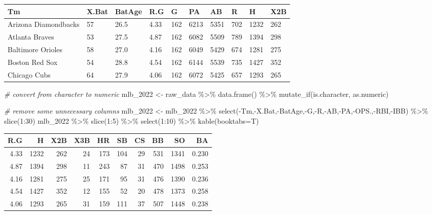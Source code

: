 \documentclass[
  11pt,
]{book}
\newenvironment{Shaded}{\begin{snugshade}}{\end{snugshade}}
\newcommand{\AttributeTok}[1]{\textcolor[rgb]{0.77,0.63,0.00}{#1}}
\newcommand{\CommentTok}[1]{\textcolor[rgb]{0.56,0.35,0.01}{\textit{#1}}}
\newcommand{\DecValTok}[1]{\textcolor[rgb]{0.00,0.00,0.81}{#1}}
\newcommand{\FunctionTok}[1]{\textcolor[rgb]{0.00,0.00,0.00}{#1}}
\newcommand{\NormalTok}[1]{#1}
\newcommand{\OtherTok}[1]{\textcolor[rgb]{0.56,0.35,0.01}{#1}}
\newcommand{\SpecialCharTok}[1]{\textcolor[rgb]{0.00,0.00,0.00}{#1}}
\theoremstyle{definition}
\theoremstyle{definition}
\theoremstyle{definition}
\theoremstyle{definition}
\theoremstyle{remark}
\begin{document}
\begin{tabular}{llllllllll}
\toprule
Tm & X.Bat & BatAge & R.G & G & PA & AB & R & H & X2B\\
\midrule
Arizona Diamondbacks & 57 & 26.5 & 4.33 & 162 & 6213 & 5351 & 702 & 1232 & 262\\
Atlanta Braves & 53 & 27.5 & 4.87 & 162 & 6082 & 5509 & 789 & 1394 & 298\\
Baltimore Orioles & 58 & 27.0 & 4.16 & 162 & 6049 & 5429 & 674 & 1281 & 275\\
Boston Red Sox & 54 & 28.8 & 4.54 & 162 & 6144 & 5539 & 735 & 1427 & 352\\
Chicago Cubs & 64 & 27.9 & 4.06 & 162 & 6072 & 5425 & 657 & 1293 & 265\\
\bottomrule
\end{tabular}

\begin{Shaded}
\begin{Highlighting}[]
\CommentTok{\# convert from character to numeric}
\NormalTok{mlb\_2022 }\OtherTok{\textless{}{-}}\NormalTok{ raw\_data }\SpecialCharTok{\%\textgreater{}\%} \FunctionTok{data.frame}\NormalTok{() }\SpecialCharTok{\%\textgreater{}\%} \FunctionTok{mutate\_if}\NormalTok{(is.character, as.numeric)}

\CommentTok{\# remove some unnecessary columns}
\NormalTok{mlb\_2022 }\OtherTok{\textless{}{-}}\NormalTok{ mlb\_2022 }\SpecialCharTok{\%\textgreater{}\%} \FunctionTok{select}\NormalTok{(}\SpecialCharTok{{-}}\NormalTok{Tm,}\SpecialCharTok{{-}}\NormalTok{X.Bat,}\SpecialCharTok{{-}}\NormalTok{BatAge,}\SpecialCharTok{{-}}\NormalTok{G,}\SpecialCharTok{{-}}\NormalTok{R,}\SpecialCharTok{{-}}\NormalTok{AB,}\SpecialCharTok{{-}}\NormalTok{PA,}\SpecialCharTok{{-}}\NormalTok{OPS.,}\SpecialCharTok{{-}}\NormalTok{RBI,}\SpecialCharTok{{-}}\NormalTok{IBB) }\SpecialCharTok{\%\textgreater{}\%} \FunctionTok{slice}\NormalTok{(}\DecValTok{1}\SpecialCharTok{:}\DecValTok{30}\NormalTok{)}
\NormalTok{mlb\_2022 }\SpecialCharTok{\%\textgreater{}\%} \FunctionTok{slice}\NormalTok{(}\DecValTok{1}\SpecialCharTok{:}\DecValTok{5}\NormalTok{) }\SpecialCharTok{\%\textgreater{}\%} \FunctionTok{select}\NormalTok{(}\DecValTok{1}\SpecialCharTok{:}\DecValTok{10}\NormalTok{) }\SpecialCharTok{\%\textgreater{}\%} \FunctionTok{kable}\NormalTok{(}\AttributeTok{booktabs=}\NormalTok{T)}
\end{Highlighting}
\end{Shaded}

\begin{tabular}{rrrrrrrrrr}
\toprule
R.G & H & X2B & X3B & HR & SB & CS & BB & SO & BA\\
\midrule
4.33 & 1232 & 262 & 24 & 173 & 104 & 29 & 531 & 1341 & 0.230\\
4.87 & 1394 & 298 & 11 & 243 & 87 & 31 & 470 & 1498 & 0.253\\
4.16 & 1281 & 275 & 25 & 171 & 95 & 31 & 476 & 1390 & 0.236\\
4.54 & 1427 & 352 & 12 & 155 & 52 & 20 & 478 & 1373 & 0.258\\
4.06 & 1293 & 265 & 31 & 159 & 111 & 37 & 507 & 1448 & 0.238\\
\bottomrule
\end{tabular}
\end{document}
